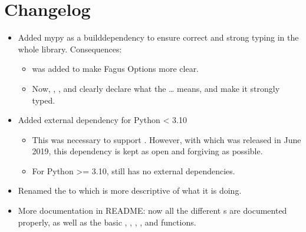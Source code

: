 \documentclass[a4paper,10pt,english]{sphinxmanual}
\begin{document}
\chapter{Changelog}
\label{\detokenize{CHANGELOG:changelog}}\label{\detokenize{CHANGELOG::doc}}
\sphinxAtStartPar
{}
\begin{itemize}
\item {}
\sphinxAtStartPar
Added mypy as a build\sphinxhyphen{}dependency to ensure correct and strong typing in the whole library. Consequences:
\begin{itemize}
\item {}
\sphinxAtStartPar
{} was added to make Fagus Options more clear.

\item {}
\sphinxAtStartPar
Now, , ,  and  clearly declare what the … means, and make it strongly typed.

\end{itemize}

\item {}
\sphinxAtStartPar
Added external dependency  for Python \textless{} 3.10
\begin{itemize}
\item {}
\sphinxAtStartPar
This was necessary to support . However, with  which was released in June 2019, this dependency is kept as open and forgiving as possible.

\item {}
\sphinxAtStartPar
For Python \textgreater{}= 3.10,  still has no external dependencies.

\end{itemize}

\item {}
\sphinxAtStartPar
Renamed the   to  which is more descriptive of what it is doing.

\item {}
\sphinxAtStartPar
More documentation in README: now all the different s are documented properly, as well as the basic , , , ,  and \sphinxhyphen{}functions.

\end{itemize}
\end{document}
